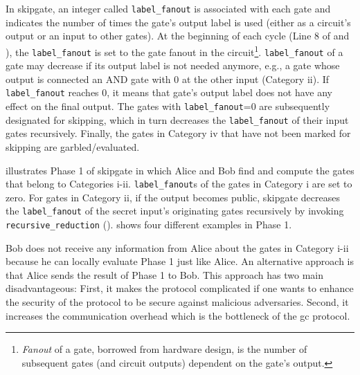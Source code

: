 In \gls{skipgate}, an integer called \texttt{label\_fanout} is associated with each gate and indicates the number of times the gate's output label is used (either as a circuit's output or an input to other gates).
At the beginning of each cycle (Line 8 of  and ), the \texttt{label\_fanout} is set to the gate fanout in the circuit\footnote{\textit{Fanout} of a gate, borrowed from hardware design, is the number of subsequent gates (and circuit outputs) dependent on the gate’s output.}.
\texttt{label\_fanout} of a gate may decrease if its output label is not needed anymore, e.g., a gate whose output is connected an AND gate with 0 at the other input (Category ii).
If \texttt{label\_fanout} reaches 0, it means that gate's output label does not have any effect on the final output.
The gates with \texttt{label\_fanout}=0 are subsequently designated for skipping, which in turn decreases the \texttt{label\_fanout} of their input gates recursively.
Finally, the gates in Category iv that have not been marked for skipping are garbled/evaluated.

\begin{algorithm}
\caption{Phase 1 in \gls{skipgate} for both Alice and Bob sides.}\label{alg:phase1}
\begin{algorithmic}[1]
		\ENDIF
	\ENDIF
\ENDFOR
\end{algorithmic}
\end{algorithm}

 illustrates Phase 1 of \gls{skipgate} in which Alice and Bob find and compute the gates that belong to Categories i-ii.
\texttt{label\_fanout}s of the gates in Category i are set to zero.
For gates in Category ii, if the output becomes public, \gls{skipgate} decreases the \texttt{label\_fanout} of the secret input's originating gates recursively by invoking \texttt{recursive\_reduction} ().
 shows four different examples in Phase 1.

Bob does not receive any information from Alice about the gates in Category i-ii because he can locally evaluate Phase 1 just like Alice.
An alternative approach is that Alice sends the result of Phase 1 to Bob.
This approach has two main disadvantageous:
First, it makes the protocol complicated if one wants to enhance the security of the protocol to be secure against malicious adversaries.
Second, it increases the communication overhead which is the bottleneck of the \acrshort{gc} protocol.

